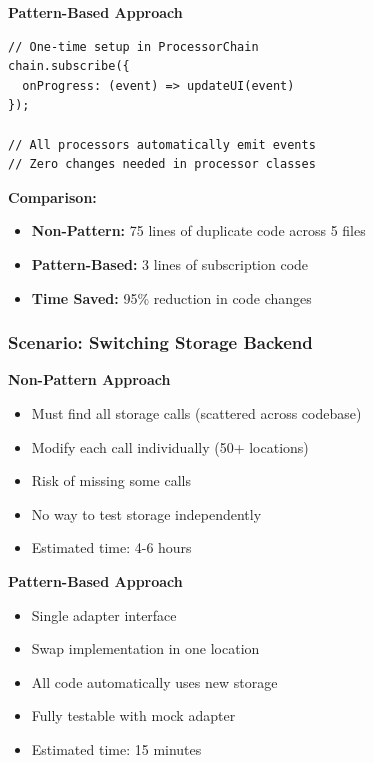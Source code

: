 \documentclass[11pt, a4paper]{article}
\theoremstyle{plain}
\theoremstyle{definition}
\begin{document}
{\bfseries Pattern-Based Approach}\par

\begin{lstlisting}[caption={Pattern-Based: Adding Progress Tracking}]
// One-time setup in ProcessorChain
chain.subscribe({
  onProgress: (event) => updateUI(event)
});

// All processors automatically emit events
// Zero changes needed in processor classes
\end{lstlisting}

\textbf{Comparison:}
\begin{itemize}
    \item \textbf{Non-Pattern:} 75 lines of duplicate code across 5 files
    \item \textbf{Pattern-Based:} 3 lines of subscription code
    \item \textbf{Time Saved:} 95\% reduction in code changes
\end{itemize}

\subsubsection{Scenario: Switching Storage Backend}

{\bfseries Non-Pattern Approach}\par
\begin{itemize}
    \item Must find all storage calls (scattered across codebase)
    \item Modify each call individually (50+ locations)
    \item Risk of missing some calls
    \item No way to test storage independently
    \item Estimated time: 4-6 hours
\end{itemize}

{\bfseries Pattern-Based Approach}\par

\begin{itemize}
    \item Single adapter interface
    \item Swap implementation in one location
    \item All code automatically uses new storage
    \item Fully testable with mock adapter
    \item Estimated time: 15 minutes
\end{itemize}
\end{document}
